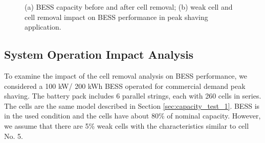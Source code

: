 \documentclass[10pt,twocolumn]{IEEEtran}
\begin{document}
\begin{figure}
\centering
\vspace{-0.2cm}
{} \vspace{-0.3cm}
\caption{ (a) BESS capacity before and after cell removal; (b) weak cell and cell removal impact on BESS  performance in  peak shaving application. }
\vspace{-0.3cm}
\label{fig:operation_impact}
\end{figure} 

\vspace{-0.3cm}
\subsection{System Operation Impact Analysis }

To examine the impact of the cell removal analysis on BESS performance, 
we considered a 100 kW/ 200 kWh BESS operated for commercial demand peak shaving.
The battery pack includes 6 parallel strings,   each with 260 cells in series.
The cells are the same model described in Section \ref{sec:capacity_test_1}.
BESS is in the used condition and the cells have about 80\% of nominal capacity.
However,  we assume that there are  5\%   weak cells with the characteristics similar to cell No. 5.
\end{document}
